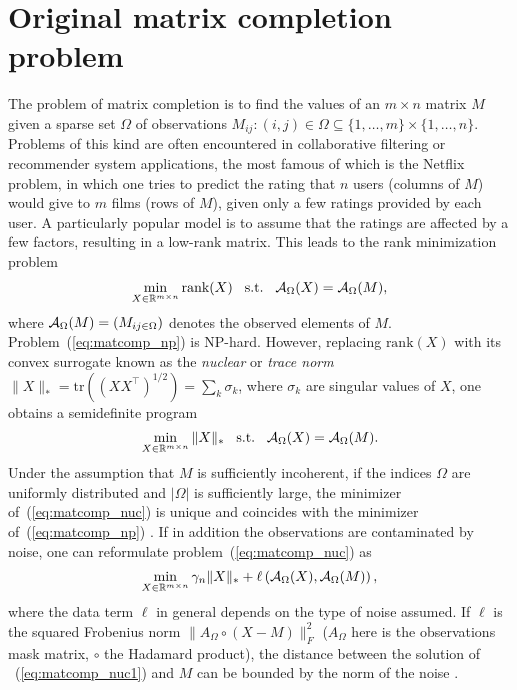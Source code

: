 \documentclass{article}
\begin{document}
\vspace{-0.1cm}
\section{Original matrix completion problem}
\label{secMatCom}
\vspace{-0.2cm}
The problem of matrix completion is to find the values of an $m\times n$ matrix $M$ given a sparse set $\Omega$ of observations $M_{ij} : (i,j) \in \Omega \subseteq \{1,\hdots, m\} \times \{1, \hdots, n\}$. 
Problems of this kind are often encountered in collaborative filtering or recommender system applications, the most famous of which is the Netflix problem, in which one tries to predict the rating that $n$ users (columns of $M$) would give to $m$ films (rows of $M$), given only a few ratings provided by each user. 
A particularly popular model is to assume that the ratings are affected by a few factors, resulting in a low-rank matrix. 
This leads to the rank minimization problem 
\vspace{-0.1cm} 
\begin{eqnarray}
\min_{X \in \mathbb{R}^{m\times n}} 			 \text{rank}(X)   \hspace{3mm} \text{s.t.} \hspace{3mm} {\cal A}_{\Omega}(X) = {\cal A}_{\Omega}(M), 
\label{eq:matcomp_np}
\end{eqnarray}
where ${\cal A}_{\Omega}(M) = (M_{ij \in \Omega})$ denotes the observed elements of $M$. Problem~(\ref{eq:matcomp_np}) is NP-hard. However, replacing $\text{rank}(X)$ with its convex surrogate known as the {\em nuclear} or {\em trace norm} \cite{srebro2004maximum}  $\| X\|_* = \mathrm{tr}((XX^\top)^{1/2}) = \sum_{k} \sigma_k$, where $\sigma_k$ are singular values of $X$, one obtains a semidefinite program 
\vspace{-0.1cm}
\begin{eqnarray}
\min_{X \in \mathbb{R}^{m\times n}} 			 \|X\|_*    \hspace{3mm} \text{s.t.} \hspace{3mm} {\cal A}_{\Omega}(X) = {\cal A}_{\Omega}(M).  
\label{eq:matcomp_nuc}
\end{eqnarray}
Under the assumption that $M$ is sufficiently incoherent, if the indices $\Omega$ are uniformly distributed and $|\Omega|$ is sufficiently large, the minimizer of~(\ref{eq:matcomp_nuc}) is unique and coincides with the minimizer of~(\ref{eq:matcomp_np}) \cite{candes2009exact,recht2011simpler}. If in addition the observations are contaminated by noise, one can reformulate problem~(\ref{eq:matcomp_nuc}) as 
\vspace{-0.3cm}
\begin{eqnarray}
\min_{X \in \mathbb{R}^{m\times n}}	\gamma_n \|X\|_*  +  \ell\left({\cal A}_{\Omega} (X),{\cal A}_{\Omega}(M)\right)  ,
\label{eq:matcomp_nuc1}
\end{eqnarray}
where the data term $\ell$ in general depends on the type of noise assumed. If $\ell$ is the squared Frobenius norm $\|A_\Omega\circ (X-M)\|_F^2$ ($A_\Omega$ here is the observations mask matrix, $\circ$ the Hadamard product), the distance between the solution of ~(\ref{eq:matcomp_nuc1}) and $M$ can be bounded by the norm of the noise \cite{candes2010matrix}. 
\end{document}

